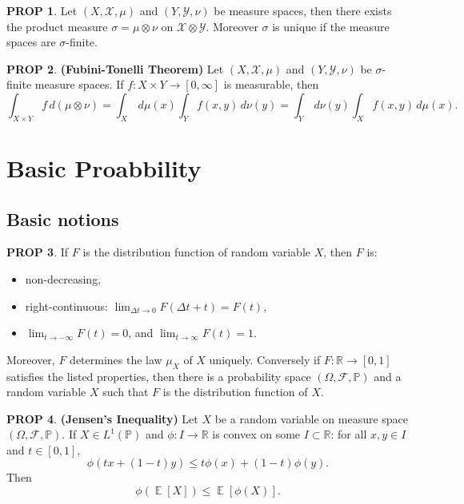 \documentclass[hidelinks,11pt]{article}
\theoremstyle{definition}
\theoremstyle{dotless}
\newtheorem{prop}{PROP}[section]
\theoremstyle{remark}
\DeclareMathOperator{\E}{\mathbb{E}}
\DeclareMathOperator{\1}{\mathbf{1}}
\begin{document}
\begin{prop}\label{Prop 1.10}
Let $(X,\mathcal{X},\mu)$ and $(Y,\mathcal{Y},\nu)$ be measure spaces, then there exists the product measure $\sigma=\mu\otimes\nu$ on $\mathcal{X}\otimes\mathcal{Y}$. Moreover $\sigma$ is unique if the measure spaces are $\sigma$-finite.
\end{prop}

\begin{prop}\textup{\textbf{(Fubini-Tonelli Theorem)}}
Let $(X,\mathcal{X},\mu)$ and $(Y,\mathcal{Y},\nu)$ be $\sigma$-finite measure spaces. If $f:X\times Y\to[0,\infty]$ is measurable, then
\[\int_{X\times Y}f\,d(\mu\otimes\nu)=\int_X\,d\mu(x)\int_Yf(x,y)\,d\nu(y)=\int_Y\,d\nu(y)\int_Xf(x,y)\,d\mu(x).\]
\end{prop}

\newpage
\section{Basic Proabbility}

\subsection{Basic notions}

\begin{prop}\label{Prop 2.1}
If $F$ is the distribution function of random variable $X$, then $F$ is:\begin{itemize}
    \item non-decreasing,
    \item right-continuous: $\lim_{\Delta t\to0}F(\Delta t+t)=F(t)$,
    \item $\lim_{t\to-\infty}F(t)=0$, and $\lim_{t\to\infty}F(t)=1$.
\end{itemize}
Moreover, $F$ determines the law $\mu_X$ of $X$ uniquely. Conversely if $F:\mathbb{R}\to[0,1]$ satisfies the listed properties, then there is a probability space $(\Omega, \mathcal{F},\mathbb{P})$ and a random variable $X$ such that $F$ is the distribution function of $X$.
\end{prop}

\begin{prop}\textup{\textbf{(Jensen's Inequality) }}Let $X$ be a random variable on measure space $(\Omega,\mathcal{F},\mathbb{P})$. If $X\in L^1(\mathbb{P})$ and $\phi:I\to\mathbb{R}$ is convex on some $I\subset\mathbb{R}$: for all $x,y\in I$ and $t\in[0,1]$,
\[\phi(tx+(1-t)y)\leq t\phi(x)+(1-t)\phi(y).\]
Then
\[\phi(\E[X])\leq\E[\phi(X)].\]
\end{prop}
\end{document}
